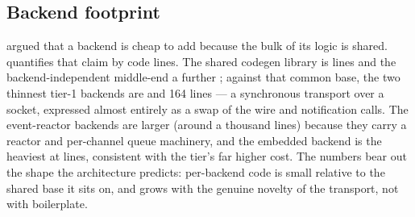 \subsection{Backend footprint}\label{sec:res-quant-footprint}

 argued that a backend is cheap to add because the bulk of its
logic is shared.  quantifies that claim by code lines.
The shared codegen library is \qshared{} lines and the backend-independent
middle-end a further \qmiddleend{}; against that common base, the two thinnest
tier-1 backends are \qthinnest{} and 164 lines --- a synchronous transport over a
socket, expressed almost entirely as a swap of the wire and notification calls. The
event-reactor backends are larger (around a thousand lines) because they carry a
reactor and per-channel queue machinery, and the embedded backend is the heaviest at
\qembed{} lines, consistent with the tier's far higher cost. The numbers bear out the
shape the architecture predicts: per-backend code is small relative to the shared
base it sits on, and grows with the genuine novelty of the transport, not with
boilerplate.

